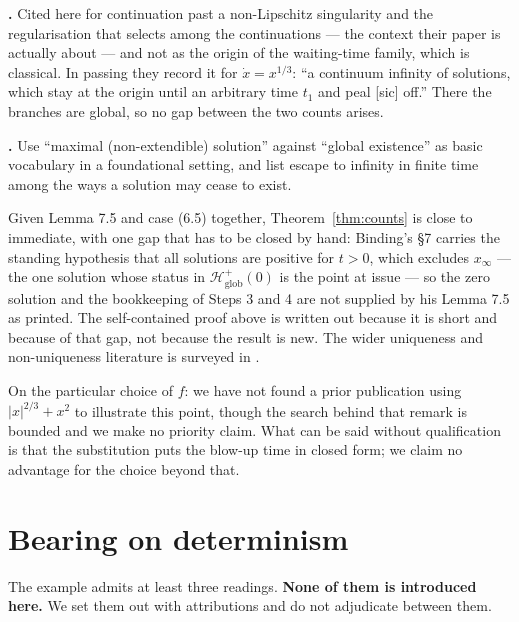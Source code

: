 \documentclass[12pt]{article}
\theoremstyle{plain}
\theoremstyle{definition}
\theoremstyle{remark}
\newcommand{\Hglob}{\mathcal{H}^{+}_{\mathrm{glob}}}
\begin{document}
\textbf{\citet{DrivasMailybaev}.} Cited here for continuation past a non-Lipschitz singularity and the
regularisation that selects among the continuations --- the context their paper
is actually about --- and not as the origin of the waiting-time family, which is
classical. In passing they record it for $\dot x=x^{1/3}$: ``a continuum
infinity of solutions, which stay at the origin until an arbitrary time $t_{1}$
and peal [sic] off.'' There the branches are global, so no gap between the two
counts arises.

\textbf{\citet{Berndl}.} Use ``maximal (non-extendible)
solution'' against ``global existence'' as basic vocabulary in a foundational
setting, and list escape to infinity in finite time among the ways a solution
may cease to exist.

Given Lemma 7.5 and case (6.5) together, Theorem~\ref{thm:counts} is close to
immediate, with one gap that has to be closed by hand: Binding's \S7 carries the
standing hypothesis that all solutions are positive for $t>0$, which excludes
$x_{\infty}$ --- the one solution whose status in $\Hglob(0)$ is the point at
issue --- so the zero solution and the bookkeeping of Steps 3 and 4 are not
supplied by his Lemma 7.5 as printed. The self-contained proof above is written
out because it is short and because of that gap, not because the result is
new. The wider uniqueness and non-uniqueness literature is
surveyed in \citet{AgarwalLakshmikantham}.

On the particular choice of $f$: we have not found a prior publication using
$|x|^{2/3}+x^{2}$ to illustrate this point, though the search behind that remark
is bounded and we make no priority claim. What can be said without qualification
is that the substitution puts the blow-up time in closed form; we claim no
advantage for the choice beyond that.

\section{Bearing on determinism}\label{sec:determinism}

The example admits at least three readings. \textbf{None of them is introduced
here.} We set them out with attributions and do not adjudicate between them.
\end{document}
